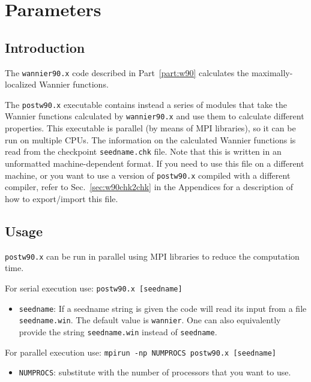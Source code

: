 \chapter{Parameters}

\section{Introduction}

The \texttt{wannier90.x} code described in Part~\ref{part:w90}
calculates the maximally-localized Wannier functions. %

The \texttt{postw90.x} executable contains instead a series of modules
that take the Wannier functions calculated by \texttt{wannier90.x} and
use them to calculate different properties.  This executable is
parallel (by means of MPI libraries), so it can be run on multiple
CPUs.  The information on the calculated Wannier functions is read
from the checkpoint \verb|seedname.chk| file. Note that this is
written in an unformatted machine-dependent format. If you need to use
this file on a different machine, or you want to use a version of
\texttt{postw90.x} compiled with a different compiler, refer to
Sec.~\ref{sec:w90chk2chk} in the Appendices for a description of how
to export/import this file. 

\section{Usage}
{\tt postw90.x} can be run in parallel using MPI libraries to
reduce the computation time.

For serial execution use: {\tt postw90.x [seedname]} 

\begin{itemize} \item 
{\tt seedname}: If a seedname string is given the code
will read its input from a file {\tt seedname.win}. The default
  value is {\tt wannier}. One can also equivalently provide the string
  {\tt seedname.win} instead of  {\tt seedname}.
\end{itemize}

For parallel execution use: {\tt mpirun -np NUMPROCS postw90.x [seedname]}

\begin{itemize} \item 
{\tt NUMPROCS}: substitute with the number of processors that you want
to use.
\end{itemize}

